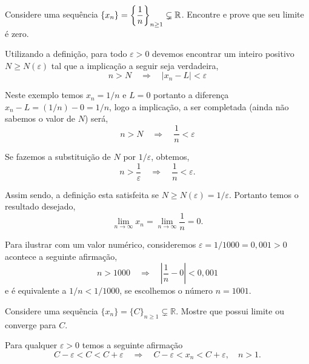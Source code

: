 \begin{exer}
Considere uma sequ\^{e}ncia $\{x_n\}=\displaystyle{\left\{ \frac{1}{n}\right\}_{n\geq 1}\subsetneq \mathbb{R}}$. Encontre e prove que seu limite \'{e} zero.
\end{exer}

\solo  Utilizando a defini\c{c}\~{a}o, para todo $\varepsilon >0$ devemos encontrar um inteiro positivo $N\geq N(\varepsilon)$ tal que a implica\c{c}\~{a}o a seguir seja verdadeira,
\begin{equation*}
    n>N \quad \Rightarrow\quad |x_n-L|<\varepsilon
\end{equation*}

Neste exemplo temos $x_n=1/n$ e $L=0$ portanto a diferen\c{c}a $x_n-L=(1/n)-0=1/n$, logo a implica\c{c}\~{a}o, a ser completada (ainda n\~{a}o sabemos o valor de $N$) ser\'{a},
\begin{equation*}
    n>N \quad \Rightarrow\quad \frac{1}{n}<\varepsilon
\end{equation*}

Se fazemos a substitui\c{c}\~{a}o de $N$ por $1/\varepsilon$, obtemos,
\begin{equation*}
    n>\frac{1}{\varepsilon}\quad \Rightarrow \quad \frac{1}{n}<\varepsilon.
\end{equation*}

Assim sendo, a defini\c{c}\~{a}o esta satisfeita se $N\geq N(\varepsilon)=1/\varepsilon$. Portanto temos o resultado desejado,
\begin{equation*}
    \lim_{n\to\infty}x_n=\lim_{n\to\infty}\frac{1}{n}=0.
\end{equation*}

Para ilustrar com um valor num\'{e}rico, consideremos $\varepsilon=1/1000=0,001>0$ acontece a seguinte afirma\c{c}\~{a}o,
\begin{equation*}
    n>1000\quad \Rightarrow \quad \left|\frac{1}{n}-0\right|<0,001
\end{equation*}
 e \'{e} equivalente a $1/n<1/1000$, se escolhemos o n\'{u}mero $n=1001$.


\begin{exer}
Considere uma sequ\^{e}ncia $\{x_n\}=\{ C\}_{n\geq 1}\subsetneq \mathbb{R}$. Mostre que possui limite ou converge para $C$.
\end{exer}

\solo Para qualquer $\varepsilon>0$ temos a seguinte afirma\c{c}\~{a}o
\begin{equation*}
    C-\varepsilon< C < C+\varepsilon\quad \Rightarrow \quad  C-\varepsilon< x_n < C+\varepsilon, \quad n > 1.
\end{equation*}


